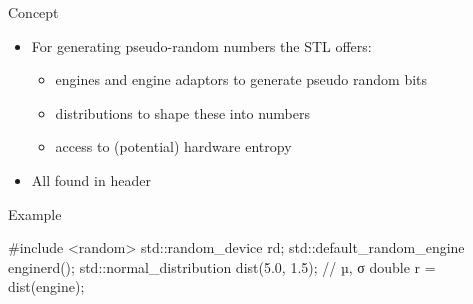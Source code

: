 
\begin{frame}[fragile]
  \begin{block}{Concept}
    \begin{itemize}
      \item For generating pseudo-random numbers the STL offers:
      \begin{itemize}
        \item engines and engine adaptors to generate pseudo random bits
        \item distributions to shape these into numbers
        \item access to (potential) hardware entropy
      \end{itemize}
      \item All found in header 
    \end{itemize}
  \end{block}
  \begin{exampleblock}{Example}
    \begin{cppcode}
      #include <random>
      std::random_device rd;
      std::default_random_engine engine{rd()};
      std::normal_distribution dist(5.0, 1.5); // µ, σ
      double r = dist(engine);
    \end{cppcode}
  \end{exampleblock}
\end{frame}

